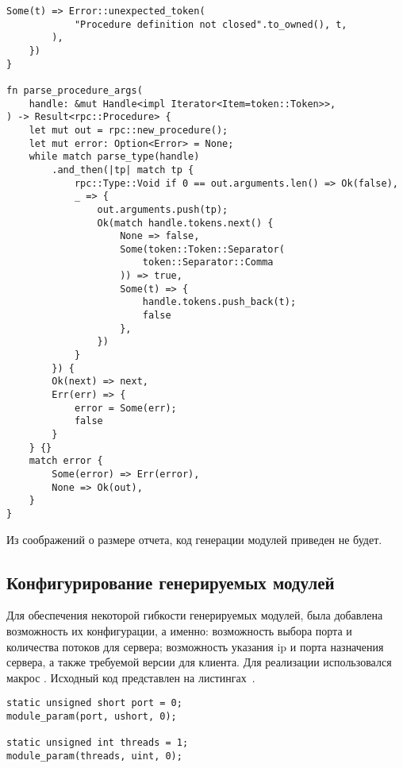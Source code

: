 \begin{lstlisting}[caption={Разбор процедуры (часть 2)}, label={lst:rust_parser_procedure2}]
        Some(t) => Error::unexpected_token(
            "Procedure definition not closed".to_owned(), t,
        ),
    })
}

fn parse_procedure_args(
    handle: &mut Handle<impl Iterator<Item=token::Token>>,
) -> Result<rpc::Procedure> {
    let mut out = rpc::new_procedure();
    let mut error: Option<Error> = None;
    while match parse_type(handle)
        .and_then(|tp| match tp {
            rpc::Type::Void if 0 == out.arguments.len() => Ok(false),
            _ => {
                out.arguments.push(tp);
                Ok(match handle.tokens.next() {
                    None => false,
                    Some(token::Token::Separator(
                        token::Separator::Comma
                    )) => true,
                    Some(t) => {
                        handle.tokens.push_back(t);
                        false
                    },
                })
            }
        }) {
        Ok(next) => next,
        Err(err) => {
            error = Some(err);
            false
        }
    } {}
    match error {
        Some(error) => Err(error),
        None => Ok(out),
    }
}
\end{lstlisting}

Из соображений о размере отчета, код генерации модулей приведен не будет.

\subsection{Конфигурирование генерируемых модулей}

Для обеспечения некоторой гибкости генерируемых модулей, была добавлена
возможность их конфигурации, а именно: возможность выбора порта и количества
потоков для сервера; возможность указания ip и порта назначения сервера, а
также требуемой версии для клиента. Для реализации использовался макрос
. Исходный код представлен на
листингах~.

\begin{lstlisting}[caption={Конфигурирование сервера}, label={lst:server_config}]
static unsigned short port = 0;
module_param(port, ushort, 0);

static unsigned int threads = 1;
module_param(threads, uint, 0);
\end{lstlisting}

